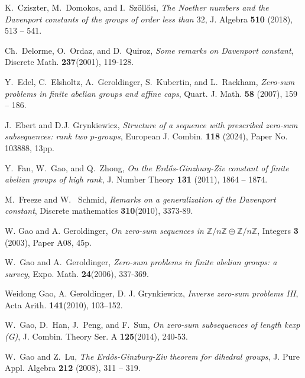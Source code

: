 \documentclass[11pt]{amsart}
\theoremstyle{definition}
\newcommand{\Z}{\mathbb Z}
\numberwithin{equation}{section}
\begin{document}
\begin{thebibliography}{99}
K.~Cziszter, M.~Domokos, and I.~Sz{\"{o}}ll{\H{o}}si, \emph{The {N}oether numbers and the {D}avenport constants of the groups of order less than $32$}, J. Algebra \textbf{510} (2018), 513 -- 541.



Ch.~Delorme, O.~Ordaz, and D.~Quiroz,
\emph{Some remarks on {D}avenport constant},
 Discrete Math. \textbf{237}(2001), 119-128.

Y.~Edel, C.~Elsholtz, A.~Geroldinger, S.~Kubertin, and L.~Rackham, \emph{Zero-sum problems in finite abelian groups and affine caps}, Quart. J. Math. \textbf{58} (2007), 159 -- 186.


J.~Ebert and D.J. Grynkiewicz, \emph{Structure of a sequence with prescribed
	zero-sum subsequences: rank two $p$-groups}, European J. Combin. \textbf{118}
(2024), Paper No. 103888, 13pp.





Y.~Fan, W.~Gao, and Q.~Zhong, \emph{On the {E}rd{\H{o}}s-{G}inzburg-{Z}iv constant of finite abelian groups of high rank}, J. Number Theory \textbf{131} (2011), 1864 -- 1874.


 M.~Freeze and W.~ Schmid, \emph{Remarks on a generalization of the Davenport constant}, Discrete mathematics \textbf{310}(2010), 3373-89.





 W. Gao and A. Geroldinger, \emph{On zero-sum sequences in $\Z/n\Z\oplus \Z/n\Z$}, Integers \textbf{3} (2003), Paper A08, 45p.

W.~Gao and A.~Geroldinger,
\emph{Zero-sum problems in finite abelian groups: a survey},
Expo. Math. \textbf{24}(2006), 337-369.


  Weidong Gao, A. Geroldinger, D. J.  Grynkiewicz,  \emph{Inverse zero-sum problems III}, Acta Arith. \textbf{141}(2010), 103–152.


W.~Gao, D.~Han, J.~Peng, and F.~Sun, \emph{On zero-sum subsequences of length kexp (G)}, J. Combin. Theory Ser. A \textbf{125}(2014), 240-53.



W.~Gao and Z.~Lu, \emph{The {E}rd{\H{o}}s-{G}inzburg-{Z}iv theorem for dihedral groups}, J. Pure Appl. Algebra \textbf{212} (2008), 311 -- 319.






\end{thebibliography}
\end{document}
